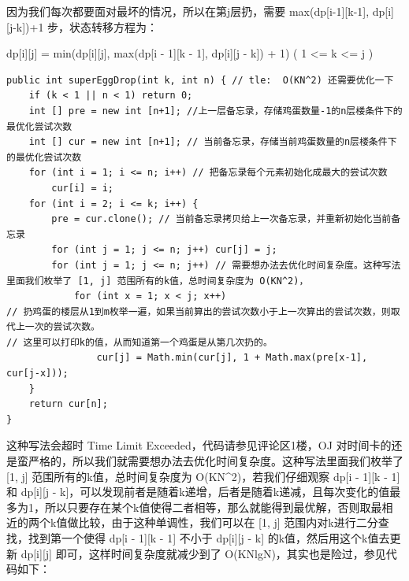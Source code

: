 \documentclass[9pt, b5paaper]{book}
\begin{document}
\begin{enumerate}
因为我们每次都要面对最坏的情况，所以在第j层扔，需要 max(dp[i-1][k-1], dp[i][j-k])+1 步，状态转移方程为：

dp[i][j] = min(dp[i][j], max(dp[i - 1][k - 1], dp[i][j - k]) + 1) ( 1 <= k <= j )

\begin{verbatim}
public int superEggDrop(int k, int n) { // tle:  O(KN^2) 还需要优化一下
    if (k < 1 || n < 1) return 0;
    int [] pre = new int [n+1]; //上一层备忘录，存储鸡蛋数量-1的n层楼条件下的最优化尝试次数
    int [] cur = new int [n+1]; // 当前备忘录，存储当前鸡蛋数量的n层楼条件下的最优化尝试次数
    for (int i = 1; i <= n; i++) // 把备忘录每个元素初始化成最大的尝试次数
        cur[i] = i;
    for (int i = 2; i <= k; i++) {
        pre = cur.clone(); // 当前备忘录拷贝给上一次备忘录，并重新初始化当前备忘录
        for (int j = 1; j <= n; j++) cur[j] = j;
        for (int j = 1; j <= n; j++) // 需要想办法去优化时间复杂度。这种写法里面我们枚举了 [1, j] 范围所有的k值，总时间复杂度为 O(KN^2)，
            for (int x = 1; x < j; x++) 
// 扔鸡蛋的楼层从1到m枚举一遍，如果当前算出的尝试次数小于上一次算出的尝试次数，则取代上一次的尝试次数。
// 这里可以打印k的值，从而知道第一个鸡蛋是从第几次扔的。
                cur[j] = Math.min(cur[j], 1 + Math.max(pre[x-1], cur[j-x]));
    }
    return cur[n];
}
\end{verbatim}

这种写法会超时 Time Limit Exceeded，代码请参见评论区1楼，OJ 对时间卡的还是蛮严格的，所以我们就需要想办法去优化时间复杂度。这种写法里面我们枚举了 [1, j] 范围所有的k值，总时间复杂度为 O(KN\^{}2)，若我们仔细观察 dp[i - 1][k - 1] 和 dp[i][j - k]，可以发现前者是随着k递增，后者是随着k递减，且每次变化的值最多为1，所以只要存在某个k值使得二者相等，那么就能得到最优解，否则取最相近的两个k值做比较，由于这种单调性，我们可以在 [1, j] 范围内对k进行二分查找，找到第一个使得 dp[i - 1][k - 1] 不小于 dp[i][j - k] 的k值，然后用这个k值去更新 dp[i][j] 即可，这样时间复杂度就减少到了 O(KNlgN)，其实也是险过，参见代码如下：


\end{enumerate}
\end{document}

